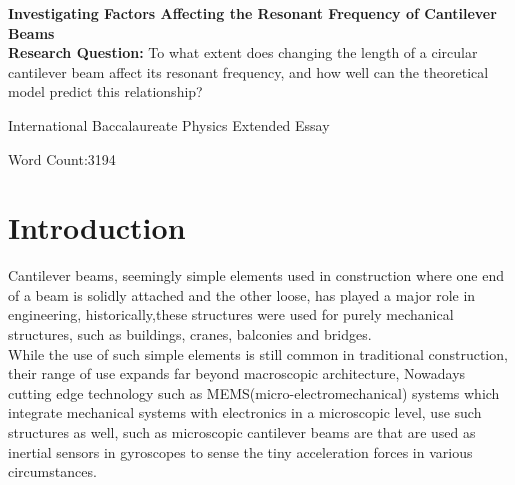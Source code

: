 \documentclass[a4paper,12pt]{article}
\newcommand{\ResearchQ}{To what extent does changing the length of a circular cantilever beam affect its resonant frequency, and how well can the theoretical model predict this relationship?}
\begin{document}
\begin{titlepage}
    \begin{center}
        \vspace*{1cm}

        \textbf{Investigating Factors Affecting the Resonant Frequency of Cantilever Beams}\\

        \vspace{.5cm}
        \textbf{Research Question:}
        \ResearchQ

        \vspace{0.5cm}
        International Baccalaureate Physics Extended Essay

        \vfill

        \vspace{0.8cm}

        Word Count:3194


    \end{center}
\end{titlepage}
\tableofcontents
{}
\pagebreak



\section{Introduction}\label{Intro}%

Cantilever beams, seemingly simple elements used in construction where one end of a beam is solidly attached and the other loose, has played a major role in engineering, historically,these structures were used for purely mechanical structures, such as buildings, cranes, balconies and bridges.\autocite{BuildingConstructionBook}\\
While the use of such simple elements is still common in traditional construction, their range of use expands far beyond macroscopic architecture, Nowadays cutting edge technology such as MEMS(micro-electromechanical) systems which integrate mechanical systems with electronics in a microscopic level, use such structures as well, such as microscopic cantilever beams are that are used as inertial sensors in gyroscopes to sense the tiny acceleration forces in various circumstances.\autocite{MemsBook}%
\end{document}
